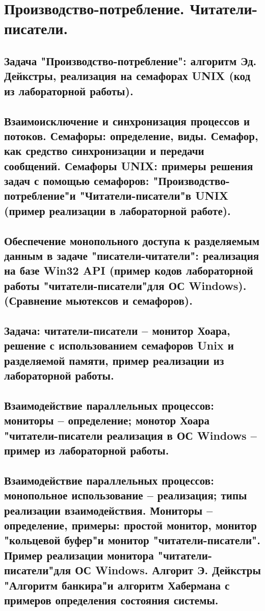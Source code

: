 \section{Производство-потребление. Читатели-писатели.}

\subsection{Задача "Производство-потребление": алгоритм Эд. Дейкстры, реализация на семафорах UNIX (код из лабораторной работы).}

\newpage

\subsection{Взаимоисключение и синхронизация процессов и потоков. Семафоры: определение, виды. Семафор, как средство синхронизации и передачи сообщений. Семафоры UNIX: примеры решения задач с помощью семафоров: "Производство-потребление"и "Читатели-писатели"в UNIX (пример реализации в лабораторной работе).}

\newpage

\subsection{Обеспечение монопольного доступа к разделяемым данным в задаче "писатели-читатели": реализация на базе Win32 API (пример кодов лабораторной работы "читатели-писатели"для ОС Windows). (Сравнение мьютексов и семафоров).}

\newpage

\subsection{Задача: читатели-писатели – монитор Хоара, решение с использованием семафоров Unix и разделяемой памяти, пример реализации из лабораторной работы.}

\newpage

\subsection{Взаимодействие параллельных процессов: мониторы – определение; монотор Хоара "читатели-писатели реализация в ОС Windows – пример из лабораторной работы.}

\newpage

\subsection{Взаимодействие параллельных процессов: монопольное использование – реализация; типы реализации взаимодействия. Мониторы – определение, примеры: простой монитор, монитор "кольцевой буфер"и монитор "читатели-писатели". Пример реализации монитора "читатели-писатели"для ОС Windows. Алгорит Э. Дейкстры "Алгоритм банкира"и алгоритм Хабермана с примеров определения состояния системы.}
